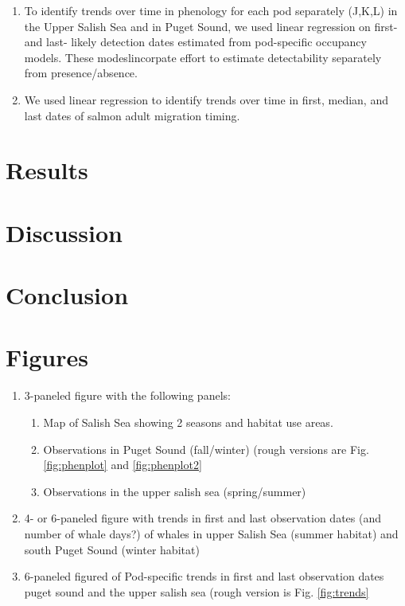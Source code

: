 \documentclass{article}
\begin{document}
\begin{enumerate}
\begin{enumerate}
\item To identify trends over time in phenology for each pod separately (J,K,L) in the Upper Salish Sea and in Puget Sound, we used linear regression on first- and last- likely detection dates estimated from pod-specific occupancy models. These modeslincorpate effort to estimate detectability separately from presence/absence.

\item We used linear regression to identify trends over time in first, median, and last dates of salmon adult migration timing.
\end{enumerate}
\end{enumerate}


\section*{Results}
\section*{Discussion}
\section*{Conclusion}

\section* {Figures}
\begin{enumerate}
\item 3-paneled figure with the following panels: 
\begin{enumerate}
\item Map of Salish Sea showing 2 seasons and habitat use areas.
\item Observations in Puget Sound (fall/winter) (rough versions are Fig. \ref{fig:phenplot} and \ref{fig:phenplot2}
\item Observations in the upper salish sea (spring/summer)
\end{enumerate}
\item 4- or 6-paneled figure with trends in first and last observation dates (and number of whale days?) of whales in upper Salish Sea (summer habitat) and south Puget Sound (winter habitat)
\item 6-paneled figured of Pod-specific trends in first and last observation dates puget sound and the upper salish sea (rough version is Fig. \ref{fig:trends}
\end{enumerate}
\end{document}

